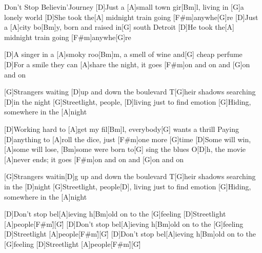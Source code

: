\documentclass[../main.tex]{subfiles}
\begin{document}
\begin{song}[2]{Don't Stop Believin'}{Journey}{}
[D]Just a [A]small town gir[Bm]l, living in [G]a lonely world
[D]She took the[A] midnight train going [F#m]anywhe[G]re
[D]Just a [A]city bo[Bm]y, born and raised in[G] south Detroit
[D]He took the[A] midnight train going [F#m]anywhe[G]re

[D]A singer in a [A]smoky roo[Bm]m, a smell of wine and[G] cheap perfume
[D]For a smile they can [A]share the night, it goes [F#m]on and on and [G]on and on

[G]Strangers waiting [D]up and down the boulevard
T[G]heir shadows searching [D]in the night
[G]Streetlight, people, [D]living just to find emotion
[G]Hiding, somewhere in the [A]night

[D]Working hard to [A]get my fil[Bm]l, everybody[G] wants a thrill
Paying [D]anything to [A]roll the dice, just [F#m]one more [G]time
[D]Some will win, [A]some will lose, [Bm]some were born to[G] sing the blues
O[D]h, the movie [A]never ends; it goes [F#m]on and on and [G]on and on

[G]Strangers waitin[D]g up and down the boulevard
T[G]heir shadows searching in the [D]night
[G]Streetlight, people[D], living just to find emotion
[G]Hiding, somewhere in the [A]night

[D]Don't stop bel[A]ieving h[Bm]old on to the [G]feeling
[D]Streetlight [A]people[F#m]{\h}[G]{\h}
[D]Don't stop bel[A]ieving h[Bm]old on to the [G]feeling
[D]Streetlight [A]people[F#m]{\h}[G]{\h}
[D]Don't stop bel[A]ieving h[Bm]old on to the [G]feeling
[D]Streetlight [A]people[F#m]{\h}[G]{\h}

\end{song}
\end{document}
